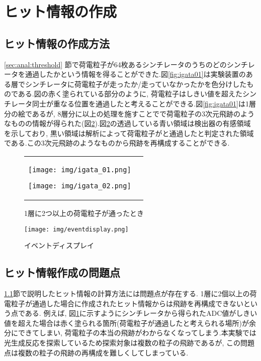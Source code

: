 \section{ヒット情報の作成}
\subsection{ヒット情報の作成方法}\label{subsec:anal:make_hit}
\ref{sec:anal:threshold} 節で荷電粒子が64枚あるシンチレータのうちのどのシンチレータを通過したかという情報を得ることができた.図\ref{fig:igata01}は実験装置のある層でシンチレータに荷電粒子が走ったか/走っていなかったかを色分けしたものである.図の赤く塗られている部分のように, 荷電粒子はしきい値を超えたシンチレータ同士が重なる位置を通過したと考えることができる.図\ref{fig:igata01}は1層分の絵であるが, 8層分に以上の処理を施すことでで荷電粒子の3次元飛跡のようなものの情報が得られた(図\ref{fig:eventdisplay}).図\ref{fig:eventdisplay}の透過している青い領域は検出器の有感領域を示しており, 黒い領域は解析によって荷電粒子がと通過したと判定された領域である.この3次元飛跡のようなものから飛跡を再構成することができる.
\begin{figure}[H]
    \begin{tabular}{cc}
        \begin{minipage}[t]{0.45\hsize}
            \centering
            \texttt{[image: img/igata\_01.png]}
            \caption{1層分のシンチレータ}
            \label{fig:igata01}
        \end{minipage}
        \begin{minipage}[t]{0.45\hsize}
            \centering
            \texttt{[image: img/igata\_02.png]}
            \caption{1層に2つ以上の荷電粒子が通ったとき}
            \label{fig:igata02}
        \end{minipage}
    \end{tabular}
\end{figure}
\begin{figure}[H]
    \centering
    \texttt{[image: img/eventdisplay.png]}
    \caption{イベントディスプレイ}
    \label{fig:eventdisplay}
\end{figure}
\subsection{ヒット情報作成の問題点}
\ref{subsec:anal:make_hit}節で説明したヒット情報の計算方法には問題点が存在する.
1層に2個以上の荷電粒子が通過した場合に作成されたヒット情報からは飛跡を再構成できないという点である.
例えば, 図\ref{fig:igata02}に示すようにシンチレータから得られたADC値がしきい値を超えた場合は赤く塗られる箇所(荷電粒子が通過したと考えられる場所)が余分にできてしまい, 荷電粒子の本当の飛跡がわからなくなってしまう.本実験では光生成反応を探索しているため探索対象は複数の粒子の飛跡であるが, この問題点は複数の粒子の飛跡の再構成を難しくしてしまっている.


